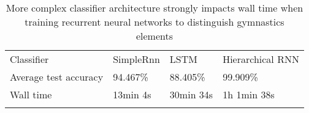 \begin{table}[htb]
\begin{tabular}{llll}
Classifier            & SimpleRnn & LSTM      & Hierarchical RNN  \\
Average test accuracy & 94.467\%  & 88.405\%  &  99.909\%         \\
Wall time             & 13min 4s  & 30min 34s & 1h 1min 38s       \\
 &  &  &  
\end{tabular}
\caption{More complex classifier architecture strongly impacts wall time when training recurrent neural networks to distinguish gymnastics elements}
\label{classifier-wall-time}
\end{table}






















